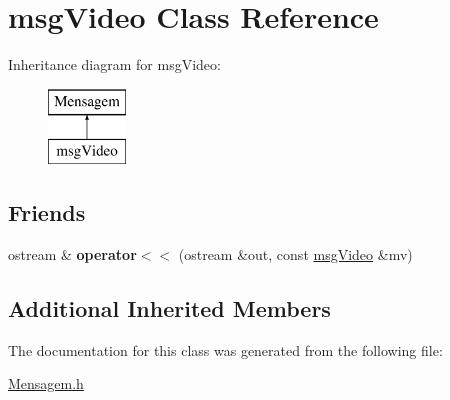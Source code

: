 \hypertarget{classmsg_video}{}\section{msg\+Video Class Reference}
\label{classmsg_video}
Inheritance diagram for msg\+Video\+:\begin{figure}[H]
\begin{center}
\leavevmode
\includegraphics[height=2.000000cm]{classmsg_video}
\end{center}
\end{figure}
\subsection*{Friends}
\begin{DoxyCompactItemize}
\item 
\hypertarget{classmsg_video_a3d97022b64515b2bac338fed8ee022a0}{}ostream \& {\bfseries operator$<$$<$} (ostream \&out, const \hyperlink{classmsg_video}{msg\+Video} \&mv)\label{classmsg_video_a3d97022b64515b2bac338fed8ee022a0}

\end{DoxyCompactItemize}
\subsection*{Additional Inherited Members}


The documentation for this class was generated from the following file\+:\begin{DoxyCompactItemize}
\item 
\hyperlink{_mensagem_8h}{Mensagem.\+h}\end{DoxyCompactItemize}
